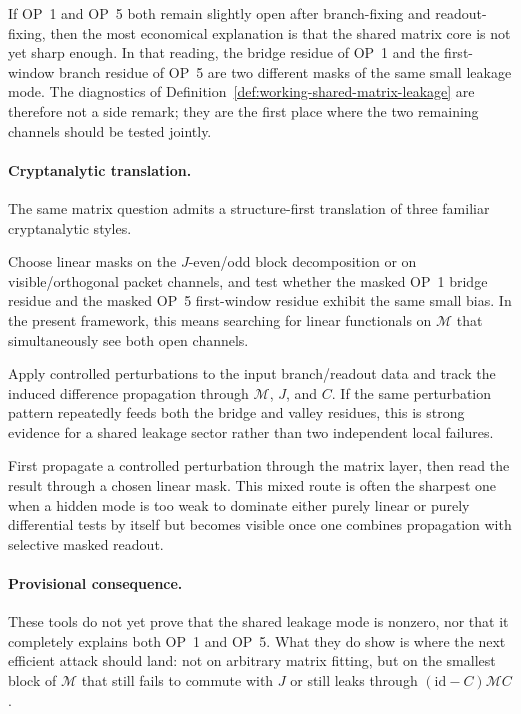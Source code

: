 \begin{remark}
\label{rem:working-op1-op5-coupling-heuristic}
If OP~1 and OP~5 both remain slightly open after branch-fixing and readout-fixing, then the most economical explanation is that the shared matrix core is not yet sharp enough. In that reading, the bridge residue of OP~1 and the first-window branch residue of OP~5 are two different masks of the same small leakage mode. The diagnostics of Definition~\ref{def:working-shared-matrix-leakage} are therefore not a side remark; they are the first place where the two remaining channels should be tested jointly.
\end{remark}

\paragraph{Cryptanalytic translation.}\label{par:working-cryptanalytic-translation}
The same matrix question admits a structure-first translation of three familiar cryptanalytic styles.
\begin{description}[leftmargin=2.2em, labelindent=0pt, itemsep=0.5em]
 \item[Linear route.] Choose linear masks on the \(J\)-even/odd block decomposition or on visible/orthogonal packet channels, and test whether the masked OP~1 bridge residue and the masked OP~5 first-window residue exhibit the same small bias. In the present framework, this means searching for linear functionals on \(\mathcal M\) that simultaneously see both open channels.
 \item[Differential route.] Apply controlled perturbations to the input branch/readout data and track the induced difference propagation through \(\mathcal M\), \(J\), and \(C\). If the same perturbation pattern repeatedly feeds both the bridge and valley residues, this is strong evidence for a shared leakage sector rather than two independent local failures.
 \item[Linear-differential route.] First propagate a controlled perturbation through the matrix layer, then read the result through a chosen linear mask. This mixed route is often the sharpest one when a hidden mode is too weak to dominate either purely linear or purely differential tests by itself but becomes visible once one combines propagation with selective masked readout.
\end{description}

\paragraph{Provisional consequence.}
These tools do not yet prove that the shared leakage mode is nonzero, nor that it completely explains both OP~1 and OP~5. What they do show is where the next efficient attack should land: not on arbitrary matrix fitting, but on the smallest block of \(\mathcal M\) that still fails to commute with \(J\) or still leaks through \((\mathrm{id}-C)\mathcal M C\).

